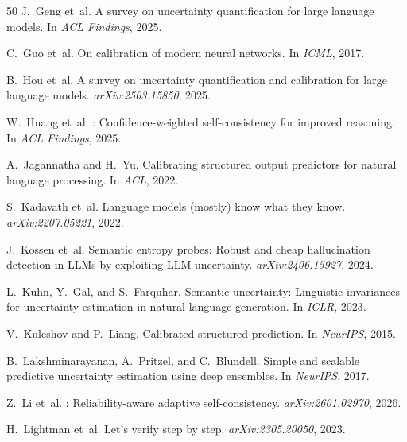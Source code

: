 \documentclass[11pt,a4paper]{article}
\begin{document}
\begin{thebibliography}{50}
J.~Geng et~al.
\newblock A survey on uncertainty quantification for large language models.
\newblock In \emph{ACL Findings}, 2025.

C.~Guo et~al.
\newblock On calibration of modern neural networks.
\newblock In \emph{ICML}, 2017.

B.~Hou et~al.
\newblock A survey on uncertainty quantification and calibration for large language models.
\newblock \emph{arXiv:2503.15850}, 2025.

W.~Huang et~al.
: Confidence-weighted self-consistency for improved reasoning.
\newblock In \emph{ACL Findings}, 2025.

A.~Jagannatha and H.~Yu.
\newblock Calibrating structured output predictors for natural language processing.
\newblock In \emph{ACL}, 2022.

S.~Kadavath et~al.
\newblock Language models (mostly) know what they know.
\newblock \emph{arXiv:2207.05221}, 2022.

J.~Kossen et~al.
\newblock Semantic entropy probes: Robust and cheap hallucination detection in {LLM}s by exploiting {LLM} uncertainty.
\newblock \emph{arXiv:2406.15927}, 2024.

L.~Kuhn, Y.~Gal, and S.~Farquhar.
\newblock Semantic uncertainty: Linguistic invariances for uncertainty estimation in natural language generation.
\newblock In \emph{ICLR}, 2023.

V.~Kuleshov and P.~Liang.
\newblock Calibrated structured prediction.
\newblock In \emph{NeurIPS}, 2015.

B.~Lakshminarayanan, A.~Pritzel, and C.~Blundell.
\newblock Simple and scalable predictive uncertainty estimation using deep ensembles.
\newblock In \emph{NeurIPS}, 2017.

Z.~Li et~al.
: Reliability-aware adaptive self-consistency.
\newblock \emph{arXiv:2601.02970}, 2026.

H.~Lightman et~al.
\newblock Let's verify step by step.
\newblock \emph{arXiv:2305.20050}, 2023.


\end{thebibliography}
\end{document}
